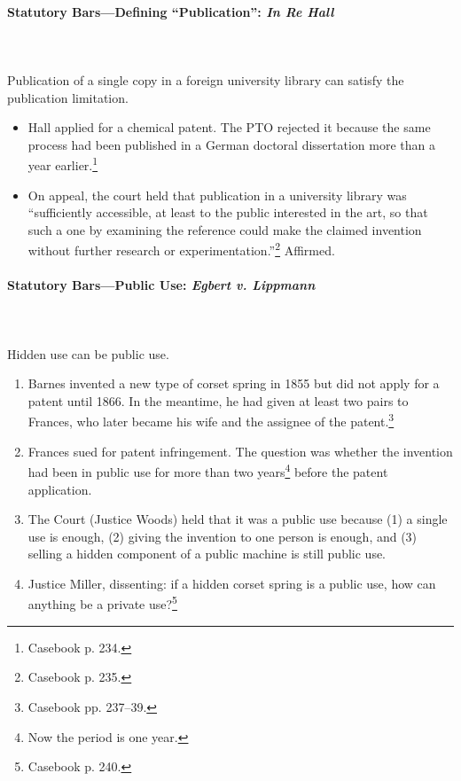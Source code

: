 \paragraph{Statutory Bars---Defining ``Publication'': \emph{In Re Hall}}
~\\\\
Publication of a single copy in a foreign university library can satisfy 
the publication limitation.

\begin{itemize}
    \item Hall applied for a chemical patent. The PTO rejected it because the 
    same process had been published in a German doctoral dissertation more than 
    a year earlier.\footnote{Casebook p. 234.}
    \item On appeal, the court held that publication in a university library was 
    ``sufficiently accessible, at least to the public interested in the art, so 
    that such a one by examining the reference could make the claimed invention 
    without further research or experimentation.''\footnote{Casebook p. 235.} 
    Affirmed.
\end{itemize}

\paragraph{Statutory Bars---Public Use: \emph{Egbert v. Lippmann}}
~\\\\
Hidden use can be public use.

\begin{enumerate}
    \item Barnes invented a new type of corset spring in 1855 but did not apply 
    for a patent until 1866. In the meantime, he had given at least two pairs to 
    Frances, who later became his wife and the assignee of the 
    patent.\footnote{Casebook pp. 237--39.}
    \item Frances sued for patent infringement. The question was whether the 
    invention had been in public use for more than two years\footnote{Now the 
    period is one year.} before the patent application.
    \item The Court (Justice Woods) held that it was a public use because (1) a 
    single use is enough, (2) giving the invention to one person is enough, and 
    (3) selling a hidden component of a public machine is still public use.
    \item Justice Miller, dissenting: if a hidden corset spring is a public use, 
    how can anything be a private use?\footnote{Casebook p. 240.}
\end{enumerate}

